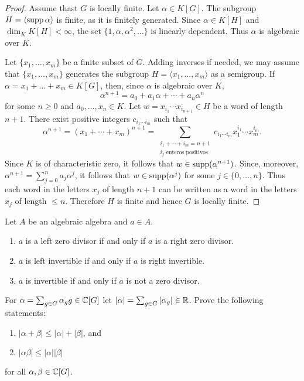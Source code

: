 \begin{proof}
	Assume thast $G$ is locally finite. Let $\alpha\in K[G]$. The subgroup 
	$H=\langle\operatorname{supp}\alpha\rangle$ is finite, as it is finitely generated. Since 
	$\alpha\in K[H]$ and $\dim_KK[H]<\infty$, the set 
	$\{1,\alpha,\alpha^2,\dots\}$ is linearly dependent. Thus $\alpha$ is
	algebraic over $K$.

	Let $\{x_1,\dots,x_m\}$ be a finite subset of $G$. Adding inverses if needed,
	we may assume that $\{x_1,\dots,x_m\}$ generates the subgroup 
	$H=\langle x_1,\dots,x_m\rangle$ as a semigroup. If
	$\alpha=x_1+\dots+x_m\in K[G]$, then, since $\alpha$ is algebraic over $K$, 
	\[
		\alpha^{n+1}=a_0+a_1\alpha+\cdots+a_n\alpha^n
	\]
	for some $n\geq0$ and $a_0,\dots,x_n\in K$. Let $w=x_{i_1}\cdots
	x_{i_{n+1}}\in H$ be a word of length $n+1$. There exist positive integers 
	$c_{i_1\cdots i_m}$ such that 
	\[
		\alpha^{n+1}=(x_1+\cdots+x_m)^{n+1}
		=\sum_{\substack{{i_1+\cdots+i_m=n+1}\\{\text{$i_j$ enteros positivos}}}} c_{i_1\cdots i_m}x_1^{i_1}\cdots x_{m}^{i_m}.
	\]
	Since $K$
	is of characteristic zero, it follows that $w\in\operatorname{supp}(\alpha^{n+1})$. Since, moreover,  
	$\alpha^{n+1}=\sum_{j=0}^na_j\alpha^j$, it follows that 
	$w\in\operatorname{supp}(\alpha^j)$ for some $j\in\{0,\dots,n\}$. Thus each
	word in the letters $x_j$ of length $n+1$ can be written as a word in the letters $x_j$ of 
	length $\leq n$. Therefore $H$ is finite and hence $G$ is locally finite. 
\end{proof}



\begin{exercise}
\label{xca:invertible_algebraic}
	Let $A$ be an algebraic algebra and $a\in A$.
	\begin{enumerate}
		\item $a$ is a left zero divisor if and only if $a$ is a right zero divisor.
		\item $a$ is left invertible if and only if $a$ is right invertible.
		\item $a$ is invertible if and only if $a$ is not a zero divisor.
	\end{enumerate}
\end{exercise}

\begin{exercise}
	\label{exa:norma}
	For $\alpha=\sum_{g\in G}\alpha_gg\in\mathbb{C}[G]$ let $|\alpha|=\sum_{g\in
	G}|\alpha_g|\in\mathbb{R}$. Prove the following statements:
	\begin{enumerate}
		\item $|\alpha+\beta|\leq|\alpha|+|\beta|$, and 
		\item $|\alpha\beta|\leq|\alpha||\beta|$ 
	\end{enumerate}
	for all $\alpha,\beta\in\mathbb{C}[G]$.
\end{exercise}


